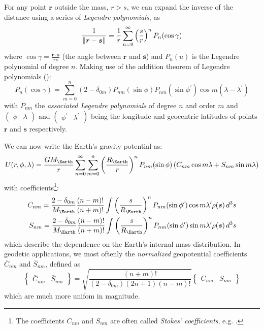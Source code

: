 For any point $\bm{r}$ outside the mass, $r > s$, we can expand the inverse of the 
distance using a series of \emph{Legendre polynomials}, as
\begin{equation}
  \frac{1}{\lVert\bm{r}-\bm{s}\rVert} = \frac{1}{r} \sum_{n=0}^{\infty} 
    \left( \frac{s}{r} \right) ^n  P_n ( \cos \gamma )
\end{equation}
where $\cos \gamma = \frac{\bm{r} \cdot \bm{s}}{rs}$ (the angle between $\bm{r}$
and $\bm{s}$) and $P_n(u)$ is the Legendre polynomial of degree $n$. Making use of 
the addition theorem of Legendre polynomials (\cite{Montenbruck2000}):
\begin{equation}
  \label{eq:mont38}
  P_n (\cos \gamma ) = \sum_{m=0}^{n} \left( 2 - \delta _{0m} \right) 
    P_{nm} (\sin \phi ) P_{nm} (\sin{\phi ^\prime}) 
    \cos{m \left( \lambda - \lambda ^\prime \right) }
\end{equation}
with $P_{nm}$ the \emph{associated Legendre polynomials} of degree $n$ and order 
$m$ and $\begin{pmatrix} \phi & \lambda \end{pmatrix}$ and 
$\begin{pmatrix} \phi ^\prime & \lambda ^\prime \end{pmatrix}$ being the longitude 
and geocentric latitudes of points $\bm{r}$ and $\bm{s}$ respectively.

We can now write the Earth's gravity potential as:
\begin{equation}\label{eq:mont310}
  U (r, \phi, \lambda ) = \frac{G M_{\Earth}}{r} \sum_{n=0}^{\infty} \sum_{m=0}^{n} 
      \left( \frac{R_{\Earth}}{r} \right) ^n P_{nm} (\sin \phi )
      \left( C_{nm} \cos {m\lambda} + S_{nm} \sin{m\lambda} \right)
\end{equation}
with coefficients\footnote{The coefficients $C_{nm}$ and $S_{nm}$ are often called 
\emph{Stokes' coefficients}, e.g. \cite{Barthelmes2018}.}:
\begin{equation}
  \begin{aligned}
    C_{nm} = \frac{2 - \delta _{0m}}{M_{\Earth}} \frac{(n-m)!}{(n+m)!} 
      \int \left({\frac{s}{R_{\Earth}}}\right)^n P_{nm} (\sin \phi ^\prime) \cos {m\lambda ^\prime} \rho (\bm{s}) \, d^3 s \\
    S_{nm} = \frac{2 - \delta _{0m}}{M_{\Earth}} \frac{(n-m)!}{(n+m)!} 
      \int \left({\frac{s}{R_{\Earth}}}\right)^n P_{nm} (\sin \phi ^\prime) \sin {m\lambda ^\prime} \rho (\bm{s}) \, d^3 s
  \end{aligned}
\end{equation}
which describe the dependence on the Earth's internal mass distribution. In geodetic 
applications, we most oftenly the \emph{normalized} geopotential coefficients 
$\bar{C}_{nm}$ and ${\bar{S}}_{nm}$, defined as
\begin{equation}
  \begin{Bmatrix} \bar{C}_{nm} & \bar{S}_{nm} \end{Bmatrix} = 
  \sqrt{\frac{(n+m)!}{\left(2-\delta _{0m}\right) \left(2n+1\right) \left(n-m\right)!}}
  \begin{Bmatrix} C_{nm} & S_{nm} \end{Bmatrix}
\end{equation}
which are much more unifom in magnitude.

